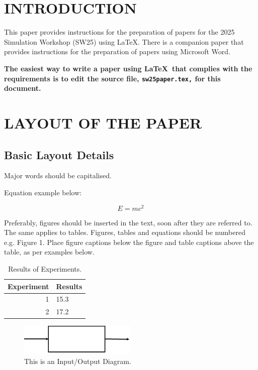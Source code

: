 \documentclass{swpaperproc}
\theoremstyle{sw}
\begin{document}

\section{INTRODUCTION}
\label{sec:intro}

This paper provides instructions for the preparation of papers for the 2025
Simulation Workshop (SW25) using \LaTeX. There is a companion paper that
provides instructions for the preparation of papers using Microsoft Word.

\textbf{The easiest way to write a paper using \LaTeX\ that complies with the
requirements is to edit the source file, {\tt sw25paper.tex,} for this document.}

\section{LAYOUT OF THE PAPER}

\subsection{Basic Layout Details}

Major words should be capitalised.

Equation example below:

\begin{equation} \label{eq:quadratic}
E = mc^2
\end{equation}

Preferably, figures should be inserted in the text, soon after they are referred to. The same
applies to tables. Figures, tables and equations should be numbered e.g. Figure 1. Place figure
captions below the figure and table captions above the table, as per examples below.


\begin{table}[h]
\centering
\caption{Results of Experiments.\label{tab: tableone}}
\begin{tabular}{|r|l|}
\hline
Experiment & Results \\ \hline
1 & 15.3 \\ \hline
2 & 17.2 \\ \hline
\end{tabular}
\end{table}

\begin{figure}
{
\centering
\includegraphics[width=0.50\textwidth]{io}
\caption{This is an Input/Output Diagram.\label{fig: tahi}}
}
\end{figure}
\end{document}
